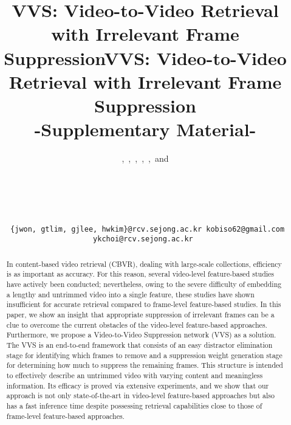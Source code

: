 \documentclass[10pt,twocolumn,letterpaper]{article}
\begin{document}
\title{VVS: Video-to-Video Retrieval with Irrelevant Frame Suppression}

\author{
\centerline{,\, ,\, ,\, ,\, ,\, and } \\
\normalsize\centerline{ \quad\, \hspace{28pt}} \\
\centerline{\tt\small \hspace{-19pt} \{jwon, gtlim, gjlee, hwkim\}@rcv.sejong.ac.kr \quad kobiso62@gmail.com \quad ykchoi@rcv.sejong.ac.kr }
}

\maketitle 

\title{VVS: Video-to-Video Retrieval with Irrelevant Frame Suppression\\ -Supplementary Material- \vspace{1cm}}
\author{}
\date{}

\ificcvfinal\thispagestyle{empty}\fi




\begin{abstract}
   In content-based video retrieval (CBVR), dealing with large-scale collections, efficiency is as important as accuracy. For this reason, several video-level feature-based studies have actively been conducted; nevertheless, owing to the severe difficulty of embedding a lengthy and untrimmed video into a single feature, these studies have shown insufficient for accurate retrieval compared to frame-level feature-based studies. In this paper, we show an insight that appropriate suppression of irrelevant frames can be a clue to overcome the current obstacles of the video-level feature-based approaches. Furthermore, we propose a Video-to-Video Suppression network (VVS) as a solution. The VVS is an end-to-end framework that consists of an easy distractor elimination stage for identifying which frames to remove and a suppression weight generation stage for determining how much to suppress the remaining frames. This structure is intended to effectively describe an untrimmed video with varying content and meaningless information. Its efficacy is proved via extensive experiments, and we show that our approach is not only state-of-the-art in video-level feature-based approaches but also has a fast inference time despite possessing retrieval capabilities close to those of frame-level feature-based approaches. 
\end{abstract}
\end{document}
